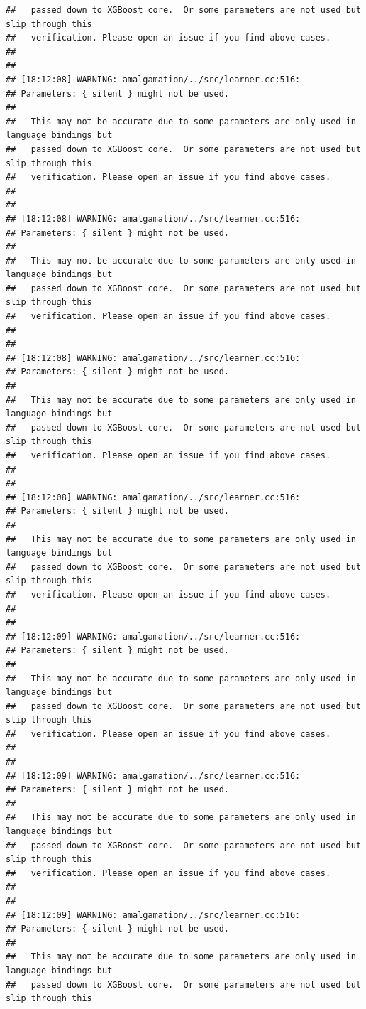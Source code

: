 \documentclass[AMS,STIX2COL]{WileyNJD-v2}\usepackage[]{graphicx}\usepackage[]{color}
\makeatletter
\newenvironment{kframe}{%
 \def\at@end@of@kframe{}%
 \ifinner\ifhmode%
  \def\at@end@of@kframe{\end{minipage}}%
  \begin{minipage}{\columnwidth}%
 \fi\fi%
 \def\FrameCommand##1{\hskip\@totalleftmargin \hskip-\fboxsep
 \colorbox{shadecolor}{##1}\hskip-\fboxsep
     \hskip-\linewidth \hskip-\@totalleftmargin \hskip\columnwidth}%
 \MakeFramed {\advance\hsize-\width
   \@totalleftmargin\z@ \linewidth\hsize
   \@setminipage}}%
 {\par\unskip\endMakeFramed%
 \at@end@of@kframe}
\newenvironment{knitrout}{}{} %
\makeatother
\begin{document}
\begin{knitrout}
\begin{kframe}
\begin{verbatim}
##   passed down to XGBoost core.  Or some parameters are not used but slip through this
##   verification. Please open an issue if you find above cases.
## 
## 
## [18:12:08] WARNING: amalgamation/../src/learner.cc:516: 
## Parameters: { silent } might not be used.
## 
##   This may not be accurate due to some parameters are only used in language bindings but
##   passed down to XGBoost core.  Or some parameters are not used but slip through this
##   verification. Please open an issue if you find above cases.
## 
## 
## [18:12:08] WARNING: amalgamation/../src/learner.cc:516: 
## Parameters: { silent } might not be used.
## 
##   This may not be accurate due to some parameters are only used in language bindings but
##   passed down to XGBoost core.  Or some parameters are not used but slip through this
##   verification. Please open an issue if you find above cases.
## 
## 
## [18:12:08] WARNING: amalgamation/../src/learner.cc:516: 
## Parameters: { silent } might not be used.
## 
##   This may not be accurate due to some parameters are only used in language bindings but
##   passed down to XGBoost core.  Or some parameters are not used but slip through this
##   verification. Please open an issue if you find above cases.
## 
## 
## [18:12:08] WARNING: amalgamation/../src/learner.cc:516: 
## Parameters: { silent } might not be used.
## 
##   This may not be accurate due to some parameters are only used in language bindings but
##   passed down to XGBoost core.  Or some parameters are not used but slip through this
##   verification. Please open an issue if you find above cases.
## 
## 
## [18:12:09] WARNING: amalgamation/../src/learner.cc:516: 
## Parameters: { silent } might not be used.
## 
##   This may not be accurate due to some parameters are only used in language bindings but
##   passed down to XGBoost core.  Or some parameters are not used but slip through this
##   verification. Please open an issue if you find above cases.
## 
## 
## [18:12:09] WARNING: amalgamation/../src/learner.cc:516: 
## Parameters: { silent } might not be used.
## 
##   This may not be accurate due to some parameters are only used in language bindings but
##   passed down to XGBoost core.  Or some parameters are not used but slip through this
##   verification. Please open an issue if you find above cases.
## 
## 
## [18:12:09] WARNING: amalgamation/../src/learner.cc:516: 
## Parameters: { silent } might not be used.
## 
##   This may not be accurate due to some parameters are only used in language bindings but
##   passed down to XGBoost core.  Or some parameters are not used but slip through this

\end{verbatim}
\end{kframe}
\end{knitrout}
\end{document}
